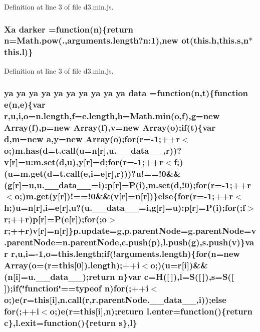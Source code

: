 Definition at line 3 of file d3.\+min.\+js.

\subsubsection[{darker}]{ {\bf Xa} darker =function({\bf n})\{{\bf return} {\bf n}={\bf Math.\+pow}(.,arguments.\+length?n\+:1),new ot(this.\+h,this.\+s,{\bf n}$\ast$this.\+l)\}}\label{d3_8min_8js_a9ad93fdd4daa8e1d6c82fafdec64e114}


Definition at line 3 of file d3.\+min.\+js.

\subsubsection[{data}]{ {\bf ya} {\bf ya} {\bf ya} {\bf ya} {\bf ya} {\bf ya} {\bf ya} {\bf ya} {\bf ya} {\bf ya} data =function({\bf n},t)\{function {\bf e}({\bf n},{\bf e})\{var {\bf r},u,{\bf i},{\bf o}=n.\+length,{\bf f}=e.\+length,h={\bf Math.\+min}({\bf o},{\bf f}),g=new Array({\bf f}),p=new Array({\bf f}),v=new Array({\bf o});{\bf if}(t)\{var {\bf d},m=new {\bf a},y=new Array({\bf o});{\bf for}({\bf r}=-\/1;++{\bf r}$<${\bf o};)m.\+has({\bf d}={\bf t.\+call}(u={\bf n}[{\bf r}],u.\+\_\+\+\_\+data\+\_\+\+\_\+,{\bf r}))?v[{\bf r}]={\bf u\+:m.\+set}({\bf d},u),y[{\bf r}]={\bf d};{\bf for}({\bf r}=-\/1;++{\bf r}$<${\bf f};)(u=m.\+get({\bf d}={\bf t.\+call}({\bf e},{\bf i}={\bf e}[{\bf r}],{\bf r})))?u!==!0\&\&(g[{\bf r}]=u,u.\+\_\+\+\_\+data\+\_\+\+\_\+={\bf i})\+:p[{\bf r}]=P({\bf i}),{\bf m.\+set}({\bf d},!0);{\bf for}({\bf r}=-\/1;++{\bf r}$<${\bf o};)m.\+get(y[{\bf r}])!==!0\&\&(v[{\bf r}]={\bf n}[{\bf r}])\}{\bf else}\{{\bf for}({\bf r}=-\/1;++{\bf r}$<$h;)u={\bf n}[{\bf r}],{\bf i}={\bf e}[{\bf r}],u?(u.\+\_\+\+\_\+data\+\_\+\+\_\+={\bf i},g[{\bf r}]=u)\+:p[{\bf r}]=P({\bf i});{\bf for}(;{\bf f}$>${\bf r};++{\bf r})p[{\bf r}]=P({\bf e}[{\bf r}]);{\bf for}(;{\bf o}$>${\bf r};++{\bf r})v[{\bf r}]={\bf n}[{\bf r}]\}{\bf p.\+update}=g,p.\+parent\+Node=g.\+parent\+Node=v.\+parent\+Node=n.\+parent\+Node,c.\+push(p),l.\+push(g),s.\+push(v)\}var {\bf r},u,{\bf i}=-\/1,{\bf o}=this.\+length;{\bf if}(!arguments.\+length)\{{\bf for}({\bf n}=new Array({\bf o}=({\bf r}={\bf this}[0]).length);++{\bf i}$<${\bf o};)(u={\bf r}[{\bf i}])\&\&({\bf n}[{\bf i}]=u.\+\_\+\+\_\+data\+\_\+\+\_\+);{\bf return} {\bf n}\}var {\bf c}=H([$\,$]),l=S([$\,$]),s=S([$\,$]);{\bf if}(\char`\"{}function\char`\"{}==typeof {\bf n}){\bf for}(;++{\bf i}$<${\bf o};){\bf e}({\bf r}={\bf this}[{\bf i}],{\bf n.\+call}({\bf r},r.\+parent\+Node.\+\_\+\+\_\+data\+\_\+\+\_\+,{\bf i}));{\bf else} {\bf for}(;++{\bf i}$<${\bf o};){\bf e}({\bf r}={\bf this}[{\bf i}],{\bf n});{\bf return} {\bf l.\+enter}=function()\{{\bf return} {\bf c}\},l.\+exit=function()\{{\bf return} s\},l\}}\label{d3_8min_8js_a6a7e68921c1e86bf377af2a03b09347a}


